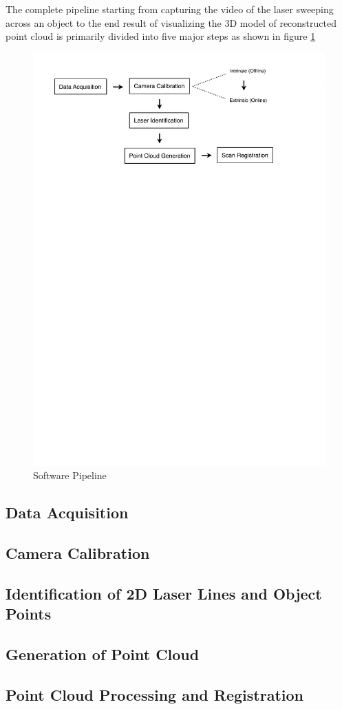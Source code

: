 The complete pipeline starting from capturing the video of the laser sweeping
across an object to the end result of visualizing the 3D model of
reconstructed point cloud is primarily divided into five major steps as shown
in figure \ref{figure:pipeline}

\begin{figure}[ht!]
\centering
\includegraphics[width=0.8\linewidth]{figures/pipeline}
\caption{Software Pipeline}
\label{figure:pipeline}
\end{figure}

\subsection{Data Acquisition}
\label{subsection:data-acquistion}


\subsection{Camera Calibration}
\label{subsection:camera-calibration}


\subsection{Identification of 2D Laser Lines and Object Points}
\label{subsection:search-laser}


\subsection{Generation of Point Cloud}
\label{subsection:generate-pointcloud}


\subsection{Point Cloud Processing and Registration}
\label{subsection:registration}

